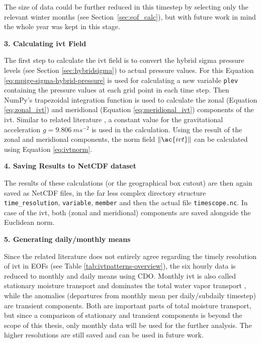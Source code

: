 The size of data could be further reduced in this timestep by selecting only the relevant winter months (see Section~\ref{sec:eof_calc}), but with future work in mind the whole year was kept in this stage. 

\textbf{3. Calculating \ac{ivt} Field}

The first step to calculate the \ac{ivt} field is to convert the hybrid sigma pressure levels (see Section \ref{sec:hybridsigma}) to actual pressure values. 
For this Equation \ref{eq:mpige-sigma-hybrid-pressure} is used for calculating a new variable \texttt{plev} containing the pressure values at each grid point in each time step. 
Then NumPy's trapezoidal integration function is used to calculate the zonal (Equation \ref{eq:zonal_ivt}) and meridional (Equation \ref{eq:meridional_ivt}) components of the \ac{ivt}. 
Similar to related literature \cite{ayantobo_integrated_2022}, a constant value for the gravitational acceleration $g = 9.806~ms^{-2}$ is used in the calculation. 
Using the result of the zonal and meridional components, the norm field $\lVert \ac{ivt} \rVert$ can be calculated using Equation \ref{eq:ivtnorm}. 



\textbf{4. Saving Results to NetCDF dataset}

The results of these calculations (or the geographical box cutout) are then again saved as NetCDF files, in the far less complex directory structure \texttt{time\_resolution}, \texttt{variable}, \texttt{member} and then the actual file \texttt{timescope.nc}. 
In case of the \ac{ivt}, both (zonal and meridional) components are saved alongside the Euclidean norm. 


\textbf{5. Generating daily/monthly means}

Since the related literature does not entirely agree regarding the timely resolution of \ac{ivt} in EOFs (see Table \ref{tab:ivtpatterns-overview}), the six hourly data is reduced to monthly and daily means using CDO.
Monthly \ac{ivt} is also called stationary moisture transport and dominates the total water vapor transport \cite{zhou_atmospheric_2005}, while the anomalies (departures from monthly mean per daily/subdaily timestep) are transient components.
Both are important parts of total moisture transport, but since a comparison of stationary and transient components is beyond the scope of this thesis, only monthly data will be used for the further analysis. 
The higher resolutions are still saved and can be used in future work. 

